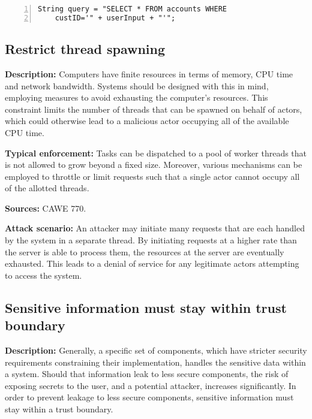  \begin{center}
\begin{minipage}{0.65\textwidth}
\begin{lstlisting}[caption={Example of a vulnerable SQL query.}, captionpos=b, label=lst:SQL_vul, numbers=left, showstringspaces=false]
String query = "SELECT * FROM accounts WHERE 
    custID='" + userInput + "'";
\end{lstlisting}
\end{minipage}
\end{center}

\subsection{Restrict thread spawning}

\textbf{Description:} Computers have finite resources in terms of memory, CPU time and network bandwidth. Systems should be designed with this in mind, employing measures to avoid exhausting the computer's resources. This constraint limits the number of threads that can be spawned on behalf of actors, which could otherwise lead to a malicious actor occupying all of the available CPU time.
 
 \textbf{Typical enforcement:} Tasks can be dispatched to a pool of worker threads that is not allowed to grow beyond a fixed size. Moreover, various mechanisms can be employed to throttle or limit requests such that a single actor cannot occupy all of the allotted threads.
 
 \textbf{Sources:} CAWE 770.
 
 \textbf{Attack scenario:} An attacker may initiate many requests that are each handled by the system in a separate thread. By initiating requests at a higher rate than the server is able to process them, the resources at the server are eventually exhausted. This leads to a denial of service for any legitimate actors attempting to access the system.

\subsection{Sensitive information must stay within trust boundary}\label{sec:trust_boundry_constraint}

\textbf{Description:} 
Generally, a specific set of components, which have stricter security requirements constraining their implementation, handles the sensitive data within a system. Should that information leak to less secure components, the risk of exposing secrets to the user, and a potential attacker, increases significantly. In order to prevent leakage to less secure components, sensitive information must stay within a trust boundary.
 
